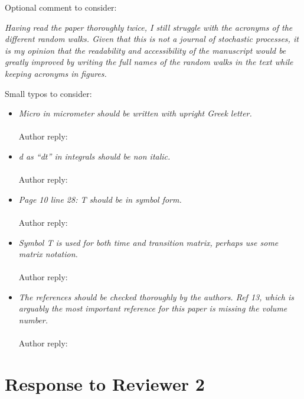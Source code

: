 \documentclass{article}
\begin{document}
\noindent Optional comment to consider:\\
\begin{addmargin}[5.8em]{0em}
	\textit{Having read the paper thoroughly twice, I still struggle with the acronyms of the different random
	walks. Given that this is not a journal of stochastic processes, it is my opinion that the readability
	and accessibility of the manuscript would be greatly improved by writing the full names of the
	random walks in the text while keeping acronyms in figures. \\}

	
\end{addmargin}

\noindent Small typos to consider: \\
\begin{addmargin}[3.3em]{0em}
\begin{itemize}
  \item \textit{Micro in micrometer should be written with upright Greek letter.} \\ \\
  		Author reply:
  		
  \item \textit{d as “dt” in integrals should be non italic.} \\ \\
  		Author reply:
  		
  \item \textit{Page 10 line 28: T should be in symbol form.} \\ \\
  		Author reply:
  		
  \item \textit{Symbol T is used for both time and transition matrix, perhaps use some matrix notation.} \\ \\
  		Author reply:
  		
  \item \textit{The references should be checked thoroughly by the authors. Ref 13, which is arguably
  the most important reference for this paper is missing the volume number.} \\ \\
		Author reply:
\end{itemize}
\end{addmargin}

\section*{Response to Reviewer 2}
\end{document}
